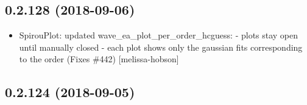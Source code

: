 \documentclass[a4paper,10pt,english]{report}
\begin{document}
\subsection{0.2.128 (2018-09-06)}
\label{\detokenize{misc/changelog:id333}}\begin{itemize}
\item {} 
SpirouPlot: updated wave\_ea\_plot\_per\_order\_hcguess: - plots stay open
until manually closed - each plot shows only the gaussian fits
corresponding to the order (Fixes \#442) {[}melissa-hobson{]}

\end{itemize}


\subsection{0.2.124 (2018-09-05)}
\end{document}

